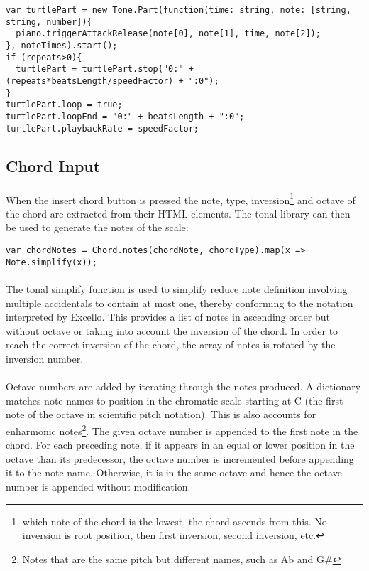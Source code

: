 \begin{verbatim}
var turtlePart = new Tone.Part(function(time: string, note: [string, string, number]){
  piano.triggerAttackRelease(note[0], note[1], time, note[2]);
}, noteTimes).start();
if (repeats>0){
  turtlePart = turtlePart.stop("0:" + (repeats*beatsLength/speedFactor) + ":0");
}
turtlePart.loop = true;
turtlePart.loopEnd = "0:" + beatsLength + ":0";
turtlePart.playbackRate = speedFactor;
\end{verbatim}

\subsection{Chord Input}

\paragraph{} When the insert chord button is pressed the note, type, inversion\footnote{which note of the chord is the lowest, the chord ascends from this. No inversion is root position, then first inversion, second inversion, etc.} and octave of the chord are extracted from their HTML elements. The tonal library can then be used to generate the notes of the scale:

\begin{verbatim}
var chordNotes = Chord.notes(chordNote, chordType).map(x => Note.simplify(x));
\end{verbatim}

\paragraph{} The tonal simplify function is used to simplify reduce note definition involving multiple accidentals to contain at most one, thereby conforming to the notation interpreted by Excello. This provides a list of notes in ascending order but without octave or taking into account the inversion of the chord. In order to reach the correct inversion of the chord, the array of notes is rotated by the inversion number.

\paragraph{} Octave numbers are added by iterating through the notes produced. A dictionary matches note names to position in the chromatic scale starting at C (the first note of the octave in scientific pitch notation). This is also accounts for enharmonic notes\footnote{Notes that are the same pitch but different names, such as Ab and G\#}. The given octave number is appended to the first note in the chord. For each preceding note, if it appears in an equal or lower position in the octave than its predecessor, the octave number is incremented before appending it to the note name. Otherwise, it is in the same octave and hence the octave number is appended without modification.

